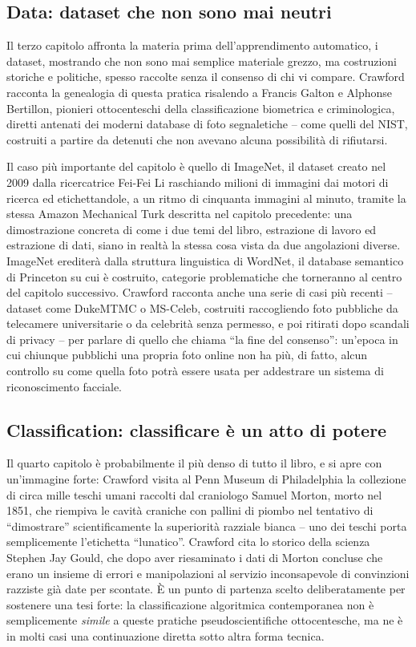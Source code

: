 \documentclass[a4paper,11pt]{article}
\begin{document}
\subsection{Data: dataset che non sono mai neutri}

Il terzo capitolo affronta la materia prima dell'apprendimento automatico, i dataset, mostrando che non sono mai semplice materiale grezzo, ma costruzioni storiche e politiche, spesso raccolte senza il consenso di chi vi compare. Crawford racconta la genealogia di questa pratica risalendo a Francis Galton e Alphonse Bertillon, pionieri ottocenteschi della classificazione biometrica e criminologica, diretti antenati dei moderni database di foto segnaletiche -- come quelli del NIST, costruiti a partire da detenuti che non avevano alcuna possibilità di rifiutarsi.

Il caso più importante del capitolo è quello di ImageNet, il dataset creato nel 2009 dalla ricercatrice Fei-Fei Li raschiando milioni di immagini dai motori di ricerca ed etichettandole, a un ritmo di cinquanta immagini al minuto, tramite la stessa Amazon Mechanical Turk descritta nel capitolo precedente: una dimostrazione concreta di come i due temi del libro, estrazione di lavoro ed estrazione di dati, siano in realtà la stessa cosa vista da due angolazioni diverse. ImageNet erediterà dalla struttura linguistica di WordNet, il database semantico di Princeton su cui è costruito, categorie problematiche che torneranno al centro del capitolo successivo. Crawford racconta anche una serie di casi più recenti -- dataset come DukeMTMC o MS-Celeb, costruiti raccogliendo foto pubbliche da telecamere universitarie o da celebrità senza permesso, e poi ritirati dopo scandali di privacy -- per parlare di quello che chiama ``la fine del consenso'': un'epoca in cui chiunque pubblichi una propria foto online non ha più, di fatto, alcun controllo su come quella foto potrà essere usata per addestrare un sistema di riconoscimento facciale.

\subsection{Classification: classificare è un atto di potere}

Il quarto capitolo è probabilmente il più denso di tutto il libro, e si apre con un'immagine forte: Crawford visita al Penn Museum di Philadelphia la collezione di circa mille teschi umani raccolti dal craniologo Samuel Morton, morto nel 1851, che riempiva le cavità craniche con pallini di piombo nel tentativo di ``dimostrare'' scientificamente la superiorità razziale bianca -- uno dei teschi porta semplicemente l'etichetta ``lunatico''. Crawford cita lo storico della scienza Stephen Jay Gould, che dopo aver riesaminato i dati di Morton concluse che erano un insieme di errori e manipolazioni al servizio inconsapevole di convinzioni razziste già date per scontate. È un punto di partenza scelto deliberatamente per sostenere una tesi forte: la classificazione algoritmica contemporanea non è semplicemente \emph{simile} a queste pratiche pseudoscientifiche ottocentesche, ma ne è in molti casi una continuazione diretta sotto altra forma tecnica.
\end{document}
